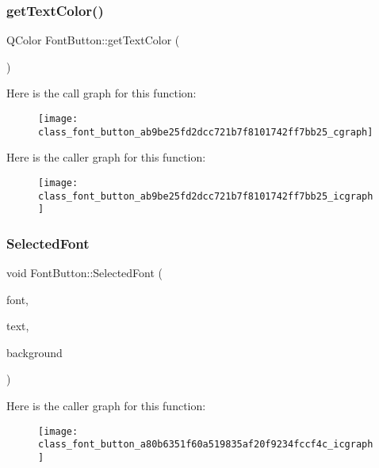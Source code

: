 \subsubsection{get\+Text\+Color()}
{\footnotesize\ttfamily Q\+Color Font\+Button\+::get\+Text\+Color (\begin{DoxyParamCaption}{ }\end{DoxyParamCaption})\hspace{0.3cm}{\ttfamily [inline]}}

Here is the call graph for this function\+:\nopagebreak
\begin{figure}[H]
\begin{center}
\leavevmode
\texttt{[image: class\_font\_button\_ab9be25fd2dcc721b7f8101742ff7bb25\_cgraph]}
\end{center}
\end{figure}
Here is the caller graph for this function\+:\nopagebreak
\begin{figure}[H]
\begin{center}
\leavevmode
\texttt{[image: class\_font\_button\_ab9be25fd2dcc721b7f8101742ff7bb25\_icgraph]}
\end{center}
\end{figure}
\mbox{\label{class_font_button_a80b6351f60a519835af20f9234fccf4c}} 
\subsubsection{Selected\+Font}
{\footnotesize\ttfamily void Font\+Button\+::\+Selected\+Font (\begin{DoxyParamCaption}\item[{Q\+Font}]{font,  }\item[{Q\+Color}]{text,  }\item[{Q\+Color}]{background }\end{DoxyParamCaption})\hspace{0.3cm}{\ttfamily [slot]}}

Here is the caller graph for this function\+:\nopagebreak
\begin{figure}[H]
\begin{center}
\leavevmode
\texttt{[image: class\_font\_button\_a80b6351f60a519835af20f9234fccf4c\_icgraph]}
\end{center}
\end{figure}
\mbox{\label{class_font_button_a84e2fd2447647d1a3bcccea7d1afd48d}} 
